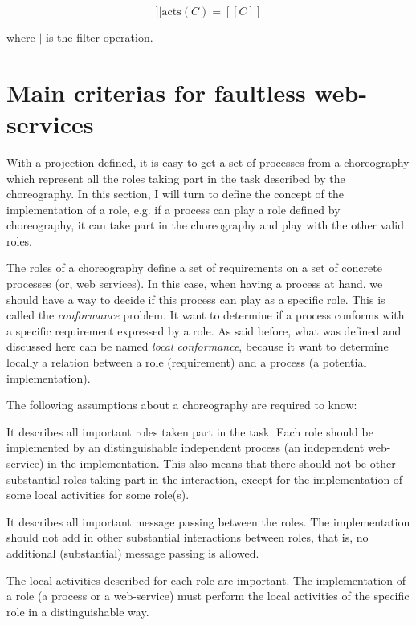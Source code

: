 \begin{equation} 
[[\text{nproj}(C', 1) || \dots || \text{nproj}(C', n)]] |  \text{acts}(C) = \left[\left[C\right]\right]
\end{equation}

where $|$ is the filter operation.

\section{Main criterias for faultless web-services}

With a projection defined, it is easy to get a set of processes from a choreography which represent all the roles taking part in the task described by the choreography. In this section, I will turn to define the concept of the implementation of a role, e.g. if a process can play a role defined by choreography, it can take part in the choreography and play with the other valid roles.

The roles of a choreography define a set of requirements on a set of concrete processes (or, web services). In this case, when having a process at hand, we should have a way to decide if this process can play as a specific role. This is called the \textit{conformance }problem. It want to determine if a process conforms with a specific requirement expressed by a role. As said before, what was defined and discussed here can be named \textit{local conformance}, because it want to determine locally a relation between a role (requirement) and a process (a potential implementation). 

The following assumptions about a choreography are required to know:

\begin{compactenum}
\item  It describes all important roles taken part in the task. Each role should be implemented by an distinguishable independent process (an independent web-service) in the implementation. This also means that there should not be other substantial roles taking part in the interaction, except for the implementation of some local activities for some role(s).

\item  It describes all important message passing between the roles. The implementation should not add in other substantial interactions between roles, that is, no additional (substantial) message passing is allowed.

\item  The local activities described for each role are important. The implementation of a role (a process or a web-service) must perform the local activities of the specific role in a distinguishable way.
\end{compactenum}

